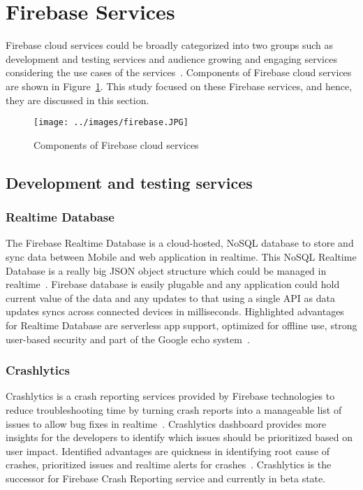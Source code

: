 \section{Firebase Services}

Firebase cloud services could be broadly categorized into two groups
such as development and testing services and audience growing and
engaging services considering the use cases of the
services~\cite{hid-sp18-409-www-firebase-products}. Components of
Firebase cloud services are shown in Figure~\ref{fig:firebase}. This
study focused on these Firebase services, and hence, they are
discussed in this section.

\begin{figure}[htb]
	\centering\texttt{[image: ../images/firebase.JPG]}
	\caption{ Components of Firebase cloud
    services~\cite{hid-sp18-409-www-firebase}}\label{fig:firebase}
\end{figure}

\subsection{Development and testing services}

\subsubsection{Realtime Database} The Firebase Realtime Database is a
cloud-hosted, NoSQL database to store and sync data between Mobile and
web application in realtime. This NoSQL Realtime Database is a really
big JSON object structure which could be managed in
realtime~\cite{hid-sp18-409-www-firebase-wikipedia,
  hid-sp18-409-www-firebase-products}. Firebase database is easily
plugable and any application could hold current value of the data and
any updates to that using a single API as data updates syncs across
connected devices in milliseconds. Highlighted advantages for Realtime
Database are serverless app support, optimized for offline use, strong
user-based security and part of the Google echo
system~\cite{hid-sp18-409-www-firebase-products}.

\subsubsection{Crashlytics} Crashlytics is a crash reporting services
provided by Firebase technologies to reduce troubleshooting time by
turning crash reports into a manageable list of issues to allow bug
fixes in
realtime~\cite{hid-sp18-409-www-firebase-products}. Crashlytics
dashboard provides more insights for the developers to identify which
issues should be prioritized based on user impact. Identified
advantages are quickness in identifying root cause of crashes,
prioritized issues and realtime alerts for
crashes~\cite{hid-sp18-409-www-firebase-products}. Crashlytics is the
successor for Firebase Crash Reporting service and currently in beta
state.

